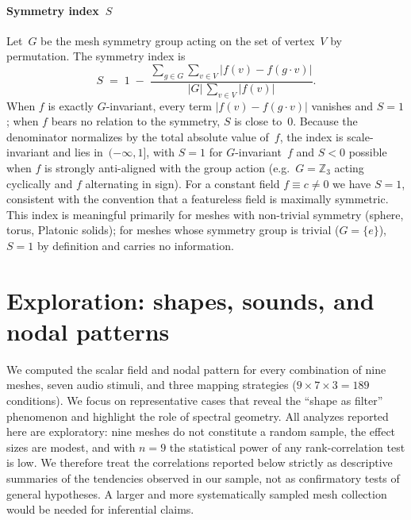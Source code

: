\documentclass[]{interact}
\theoremstyle{plain}
\theoremstyle{definition}
\theoremstyle{remark}
\begin{document}
\paragraph{Symmetry index~$S$}
Let~$G$ be the mesh symmetry group acting on the set of vertex~$V$ by permutation. The symmetry index is
\begin{equation}
\label{eq:symmetry}
S \;=\; 1 \;-\;
\frac{\displaystyle\sum_{g\in G}\sum_{v\in V}\bigl|f(v)-f(g\cdot v)\bigr|}
     {\displaystyle|G|\,\sum_{v\in V}\bigl|f(v)\bigr|}.
\end{equation}
When $f$ is exactly $G$-invariant, every term $|f(v)-f(g\cdot v)|$ vanishes and $S=1$; when $f$ bears no relation to the symmetry, $S$ is close to~$0$. Because the denominator normalizes by the total absolute value of~$f$, the index is scale-invariant and lies in~$(-\infty,1]$, with $S=1$ for $G$-invariant~$f$ and $S<0$ possible when $f$ is strongly anti-aligned with the group action (e.g.\ $G=\mathbb{Z}_3$ acting cyclically and $f$ alternating in sign). For a constant field $f\equiv c\neq 0$ we have $S=1$, consistent with the convention that a featureless field is maximally symmetric. This index is meaningful primarily for meshes with non-trivial symmetry (sphere, torus, Platonic solids); for meshes whose symmetry group is trivial ($G=\{e\}$), $S=1$ by definition and carries no information.

\section{Exploration: shapes, sounds, and nodal patterns}
\label{sec:exploration}

We computed the scalar field and nodal pattern for every combination of nine meshes, seven audio stimuli, and three mapping strategies ($9\times7\times3=189$ conditions). We focus on representative cases that reveal the ``shape as filter'' phenomenon and highlight the role of spectral geometry. All analyzes reported here are exploratory: nine meshes do not constitute a random sample, the effect sizes are modest, and with $n=9$ the statistical power of any rank-correlation test is low. We therefore treat the correlations reported below strictly as descriptive summaries of the tendencies observed in our sample, not as confirmatory tests of general hypotheses. A larger and more systematically sampled mesh collection would be needed for inferential claims.
\end{document}

